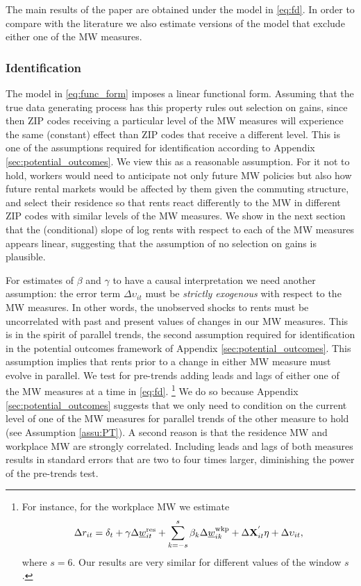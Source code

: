 The main results of the paper are obtained under the model in \eqref{eq:fd}. 
In order to compare with the literature we also estimate versions of the 
model that exclude either one of the MW measures.

\subsubsection*{Identification}

The model in \eqref{eq:func_form} imposes a linear functional form.
Assuming that the true data generating process has this property rules out 
selection on gains, since then ZIP codes receiving a particular level of the
MW measures will experience the same (constant) effect than ZIP codes that 
receive a different level.
This is one of the assumptions required for identification according to 
Appendix \ref{sec:potential_outcomes}.
We view this as a reasonable assumption.
For it not to hold, workers would need to anticipate not only future MW policies 
but also how future rental markets would be affected by them given the commuting 
structure, and select their residence so that rents react differently to the 
MW in different ZIP codes with similar levels of the MW measures.
We show in the next section that the (conditional) slope of log rents with 
respect to each of the MW measures appears linear, suggesting that the 
assumption of no selection on gains is plausible.

For estimates of $\beta$ and $\gamma$ to have a causal interpretation we need 
another assumption: the error term $\Delta\upsilon_{it}$ must be 
\textit{strictly exogenous} with respect to the MW measures.
In other words, the unobserved shocks to rents must be uncorrelated with past 
and present values of changes in our MW measures.
This is in the spirit of parallel trends, the second assumption required for
identification in the potential outcomes framework of Appendix 
\ref{sec:potential_outcomes}.
This assumption implies that rents prior to a change in either MW measure must
evolve in parallel.
We test for pre-trends adding leads and lags of either one of the MW measures 
at a time in \eqref{eq:fd}.%
\footnote{For instance, for the workplace MW we estimate
\begin{equation*}
    \Delta r_{it} = \delta_t
                  + \gamma \Delta \underline{w}^{\text{res}}_{it} 
                  + \sum_{k=-s}^{s} \beta_k \Delta \underline{w}^{\text{wkp}}_{ik}
                  + \Delta \mathbf{X}^{'}_{it}\eta
                  + \Delta \upsilon_{it} ,
\end{equation*}
where $s=6$.
Our results are very similar for different values of the window $s$.}
We do so because Appendix \ref{sec:potential_outcomes} suggests that we only 
need to condition on the current level of one of the MW measures for parallel 
trends of the other measure to hold (see Assumption \ref{assu:PT}).
A second reason is that the residence MW and workplace MW are strongly 
correlated.
Including leads and lags of both measures results in standard errors that are
two to four times larger, diminishing the power of the pre-trends test.

